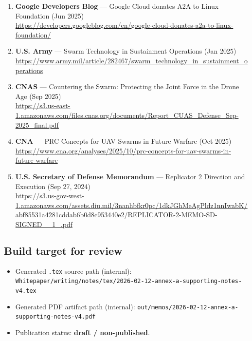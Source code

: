 \documentclass[
]{article}
\providecommand{\tightlist}{%
  \setlength{\itemsep}{0pt}\setlength{\parskip}{0pt}}
\begin{document}
\begin{enumerate}
  an upgrade (Jul 2025)\\
  \url{https://cloud.google.com/blog/products/ai-machine-learning/agent2agent-protocol-is-getting-an-upgrade}
\item
  \textbf{Google Developers Blog} --- Google Cloud donates A2A to Linux
  Foundation (Jun 2025)\\
  \url{https://developers.googleblog.com/en/google-cloud-donates-a2a-to-linux-foundation/}
\item
  \textbf{U.S. Army} --- Swarm Technology in Sustainment Operations (Jan
  2025)\\
  \url{https://www.army.mil/article/282467/swarm_technology_in_sustainment_operations}
\item
  \textbf{CNAS} --- Countering the Swarm: Protecting the Joint Force in
  the Drone Age (Sep 2025)\\
  \url{https://s3.us-east-1.amazonaws.com/files.cnas.org/documents/Report_CUAS_Defense_Sep-2025_final.pdf}
\item
  \textbf{CNA} --- PRC Concepts for UAV Swarms in Future Warfare (Oct
  2025)\\
  \url{https://www.cna.org/analyses/2025/10/prc-concepts-for-uav-swarms-in-future-warfare}
\item
  \textbf{U.S. Secretary of Defense Memorandum} --- Replicator 2
  Direction and Execution (Sep 27, 2024)\\
  \url{https://s3.us-gov-west-1.amazonaws.com/assets.diu.mil/3nanhbfkr0pc/1dkJGhMeAgPldz1nnIwabK/abf85531a4281cddab6b0d8c953440e2/REPLICATOR-2-MEMO-SD-SIGNED__1_.pdf}
\end{enumerate}

\hypertarget{build-target-for-review}{%
\subsection{Build target for review}\label{build-target-for-review}}

\begin{itemize}
\tightlist
\item
  Generated \texttt{.tex} source path (internal):
  \texttt{Whitepaper/writing/notes/tex/2026-02-12-annex-a-supporting-notes-v4.tex}
\item
  Generated PDF artifact path (internal):
  \texttt{out/memos/2026-02-12-annex-a-supporting-notes-v4.pdf}
\item
  Publication status: \textbf{draft / non-published}.
\end{itemize}
\end{document}
